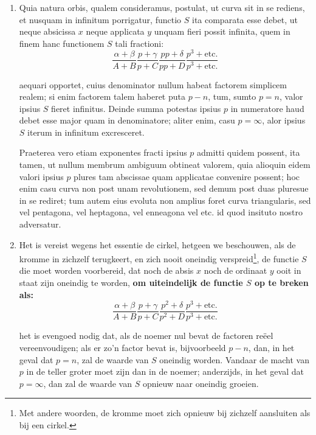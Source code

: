 \documentclass[10pt,a4paper]{article}
\newcommand{\switchenum}{\setcounter{enumi}{\arabic{enumi}-1}\switchcolumn}
\begin{document}
\begin{paracol}{2}
\begin{enumerate}[topsep=1px]
		\switchcolumn*
		
		\item Quia natura orbis, qualem consideramus, postulat, ut curva sit in se rediens, et nusquam in infinitum porrigatur, functio $S$ ita comparata esse debet, ut neque absicissa $x$ neque applicata $y$ unquam fieri possit infinita, quem in finem hanc functionem $S$ tali fractioni:
		\[
			\frac{\alpha+\beta}{A+B}\frac{p+\gamma }{p+C} \frac{p p+\delta}{p p+D} \frac{p^3+\text{etc}.}{p^3+\text{etc}.}
		\]
		\par aequari opportet, cuius denominator nullum habeat factorem simplicem realem; si enim factorem talem haberet puta $p-n$, tum, sumto $p=n$, valor ipsius $S$ fieret infinitus. Deinde summa potestas ipsius $p$ in numeratore haud debet esse major quam in denominatore; aliter enim, casu $p=\infty$, alor ipsius $S$ iterum in infinitum excresceret.
		
		\newpage
		
		Praeterea vero etiam exponentes fracti ipsius $p$ admitti quidem possent, ita tamen, ut nullum membrum ambiguum obtineat valorem, quia alioquin eidem valori ipsius $p$ plures tam abscissae quam applicatae convenire possent; hoc enim casu curva non post unam revolutionem, sed demum post duas pluresue in se rediret; tum autem eius evoluta non amplius foret curva triangularis, sed vel pentagona, vel heptagona, vel enneagona vel etc. id quod insituto nostro adversatur.
		
		\switchenum
		\item Het is vereist wegens het essentie de cirkel, hetgeen we beschouwen, als de kromme in zichzelf terugkeert, en zich nooit oneindig verspreid\footnote{Met andere woorden, de kromme moet zich opnieuw bij zichzelf aansluiten als bij een cirkel.}, de functie $S$ die moet worden voorbereid, dat noch de absis $x$ noch de ordinaat $y$ ooit in staat zijn oneindig te worden, \textbf{om uiteindelijk de functie $S$ op te breken als:}
		\[
			\frac{\alpha+\beta}{A+B}\frac{p+\gamma }{p+C} \frac{p^2+\delta}{p^2+D} \frac{p^3+\text{etc}.}{p^3+\text{etc}.}
		\]
		\par het is evengoed nodig dat, als de noemer nul bevat de factoren reëel vereenvoudigen; als er zo'n factor bevat is, bijvoorbeeld $p-n$, dan, in het geval dat $p=n$, zal de waarde van $S$ oneindig worden. Vandaar de macht van $p$ in de teller groter moet zijn dan in de noemer; anderzijds, in het geval dat $p=\infty$, dan zal de waarde van $S$ opnieuw naar oneindig groeien.
		
		\newpage
		

\end{enumerate}
\end{paracol}
\end{document}
